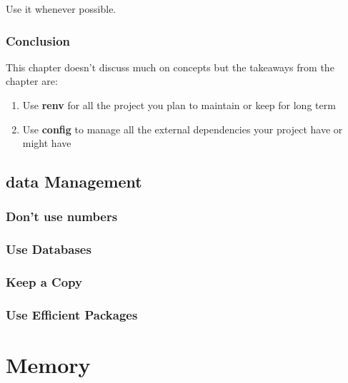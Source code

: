 \documentclass[
]{book}
\providecommand{\tightlist}{%
  \setlength{\itemsep}{0pt}\setlength{\parskip}{0pt}}
\begin{document}
Use it whenever possible.

\hypertarget{conclusion-3}{%
\section{Conclusion}\label{conclusion-3}}

This chapter doesn't discuss much on concepts but the takeaways from the chapter are:

\begin{enumerate}
\def\labelenumi{\arabic{enumi}.}
\tightlist
\item
  Use \textbf{renv} for all the project you plan to maintain or keep for long term
\item
  Use \textbf{config} to manage all the external dependencies your project have or might have
\end{enumerate}

\hypertarget{dataManagement}{%
\chapter{data Management}\label{dataManagement}}

\hypertarget{dont-use-numbers}{%
\section{Don't use numbers}\label{dont-use-numbers}}

\hypertarget{use-databases}{%
\section{Use Databases}\label{use-databases}}

\hypertarget{keep-a-copy}{%
\section{Keep a Copy}\label{keep-a-copy}}

\hypertarget{use-efficient-packages}{%
\section{Use Efficient Packages}\label{use-efficient-packages}}

\hypertarget{part-memory}{%
\part{Memory}\label{part-memory}}
\end{document}
